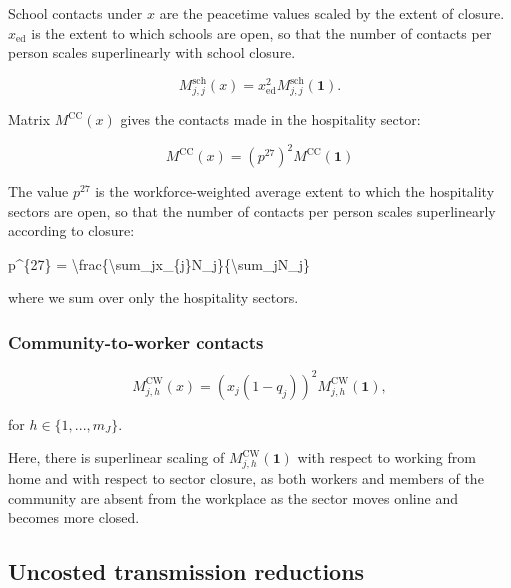 \documentclass[
]{article}
\newenvironment{Shaded}{\begin{snugshade}}{\end{snugshade}}
\newcommand{\NormalTok}[1]{#1}
\begin{document}
School contacts under \(x\) are the peacetime values scaled by the extent of closure. \(x_{\text{ed}}\) is the extent to which schools are open, so that the number of contacts per person scales superlinearly with school closure.

\begin{equation}
M_{j,j}^{\text{sch}}(x)=x_{\text{ed}}^2M_{j,j}^{\text{sch}}(\textbf{1}).
\label{eq:school}
\end{equation}

Matrix \(M^{\text{CC}}(x)\) gives the contacts made in the hospitality sector:

\begin{equation}
M^{\text{CC}}(x) = (p^{27})^2M^{\text{CC}}(\textbf{1})
\label{eq:hosp}
\end{equation}

The value \(p^{27}\) is the workforce-weighted average extent to which the hospitality sectors are open, so that the number of contacts per person scales superlinearly according to closure:

\begin{Shaded}
\begin{Highlighting}[]
\NormalTok{p\^{}\{27\} = \textbackslash{}frac\{\textbackslash{}sum\_jx\_\{j\}N\_j\}\{\textbackslash{}sum\_jN\_j\}}
\end{Highlighting}
\end{Shaded}

where we sum over only the hospitality sectors.

\subsubsection{Community-to-worker contacts}\label{community-to-worker-contacts}

\begin{equation}
M_{j,h}^{\text{CW}}(x) = (x_{j}(1-q_j))^2M_{j,h}^{\text{CW}}(\textbf{1}),
\label{eq:ctow}
\end{equation}

for \(h\in\{1,...,m_J\}\).

Here, there is superlinear scaling of \(M^{\text{CW}}_{j,h}(\textbf{1})\) with respect to working from home and with respect to sector closure, as both workers and members of the community are absent from the workplace as the sector moves online and becomes more closed.

\subsection{Uncosted transmission reductions}\label{uncosted-transmission-reductions}
\end{document}
